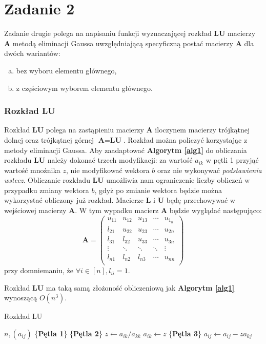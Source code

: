 \documentclass[12pt]{article}
\begin{document}
\section{Zadanie 2}
Zadanie drugie polega na napisaniu funkcji wyznaczającej rozkład \textbf{LU} macierzy \textbf{A} metodą eliminacji Gaussa uwzględniającą specyficzną postać macierzy \textbf{A} dla dwóch wariantów:
\begin{enumerate}[(a)]
	\item bez wyboru elementu głównego,
	\item z częściowym wyborem elementu głównego.
\end{enumerate}


\subsubsection*{Rozkład LU}
Rozkład \textbf{LU} polega na zastąpieniu macierzy \textbf{A} iloczynem macierzy trójkątnej dolnej oraz trójkątnej górnej $\textbf{A} = \textbf{L}\textbf{U}$. Rozkład można policzyć korzystając z metody eliminacji Gaussa. Aby zaadaptować \textbf{Algorytm \ref{alg1}} do obliczania rozkładu \textbf{LU} należy dokonać trzech modyfikacji: za wartość $a_{ik}$ w pętli 1 przyjąć wartość mnożnika $z$, nie modyfikować wektora $b$ oraz nie wykonywać \textit{podstawienia wstecz}. Obliczanie rozkładu \textbf{LU} umożliwia nam ograniczenie liczby obliczeń w przypadku zmiany wektora $b$, gdyż po zmianie wektora będzie można wykorzystać obliczony już rozkład. Macierze \textbf{L} i \textbf{U} będę przechowywać w wejściowej macierzy \textbf{A}. W tym wypadku macierz \textbf{A} będzie wyglądać następująco:
\begin{equation}
\textbf{A} = 
\begin{pmatrix}
u_{1 1} & u_{1 2} & u_{1 3} & \cdots & u_{1_n}\\
l_{2 1} & u_{2 2} & u_{2 3} & \cdots & u_{2 n}\\
l_{3 1} & l_{3 2} & u_{3 3} & \cdots & u_{3 n}\\
\vdots & \ddots & \ddots & \ddots & \vdots \\
l_{n 1} & l_{n 2} & l_{n 3} & \cdots & u_{n n}\\
\end{pmatrix}
\end{equation}
przy domniemaniu, że $\forall i \in [n], l_{ii}=1$.

Rozkład \textbf{LU} ma taką samą złożoność obliczeniową jak \textbf{Algorytm \ref{alg1}} wynoszącą $O(n^3)$.
\begin{algorithm} %
\caption{Rozkład LU}
\label{alg5} %
\begin{algorithmic} %
    \REQUIRE $n, (a_{ij})$
    \STATE \{\textbf{Pętla 1}\}
    		\STATE \{\textbf{Pętla 2}\}
		\STATE $z \leftarrow a_{ik}/a_{kk}$
		\STATE $a_{ik} \leftarrow z$
    			\STATE \{\textbf{Pętla 3}\}
				\STATE $a_{ij} \leftarrow a_{ij} - z a_{kj}$
    			\ENDFOR
    		\ENDFOR
    \ENDFOR
\end{algorithmic}
\end{algorithm}
\end{document}
